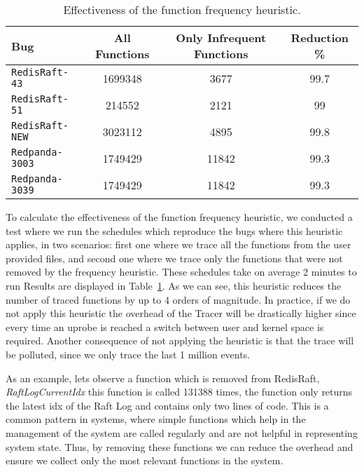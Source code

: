 \begin{table}[h]
	\scriptsize
	\centering
	\caption{Effectiveness of the function frequency heuristic.}
	\label{tab:function_frequency}
	\begin{tabular}{|l|c|c|c|}
		\hline
		\textbf{Bug}           & \textbf{All Functions} & \textbf{Only Infrequent Functions} & \textbf{Reduction \%} \\ \hline
		\texttt{RedisRaft-43}  & 1699348                & 3677                               & 99.7                  \\ \hline
		\texttt{RedisRaft-51}  & 214552                 & 2121                               & 99                    \\ \hline
		\texttt{RedisRaft-NEW} & 3023112                & 4895                               & 99.8                  \\ \hline
		\texttt{Redpanda-3003} & 1749429                & 11842                              & 99.3                  \\ \hline
		\texttt{Redpanda-3039} & 1749429                & 11842                              & 99.3                  \\ \hline
	\end{tabular}
\end{table}

To calculate the effectiveness of the function frequency heuristic, we conducted a test where we run the schedules which reproduce the bugs where this heuristic applies, in two scenarios: first one where we trace all the functions from the user provided files, and second one where we trace only the functions that were not removed by the frequency heuristic. These schedules take on average 2 minutes to run
Results are displayed in Table~\ref{tab:function_frequency}.
As we can see, this heuristic reduces the number of traced functions by up to 4 orders of magnitude. In practice, if we do not apply this heuristic the overhead of the Tracer will be drastically higher since every time an uprobe is reached a switch between user and kernel space is required. Another consequence of not applying the heuristic is that the trace will be polluted, since we only trace the last 1 million events.

As an example, lets observe a function which is removed from RedisRaft, \textit{RaftLogCurrentIdx} this function is called 131388 times, the function only returns the latest idx of the Raft Log and contains only two lines of code. This is a common pattern in systems, where simple functions which help in the management of the system are called regularly and are not helpful in representing system state. Thus, by removing these functions we can reduce the overhead and ensure we collect only the most relevant functions in the system.

